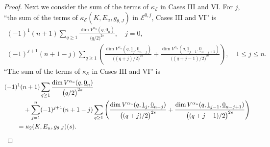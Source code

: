 \documentclass[10pt,a4paper]{amsart}
\numberwithin{equation}{section}
\newcommand{\cE}{\mathcal{E}}
\begin{document}
\begin{proof}
 Next we consider the sum of the terms of $\kappa_{\cE}$ in Cases III and VI.
 For $j$,
 ``the sum of the terms of $\kappa_{\cE} (K, E_{u} , g_{\theta , J} ) $ in $\cE^{0,j}$, Cases III and VI'' is
 \begin{gather*}
 (-1 )^{1} (n+1)
 \sum_{q \geq 1 }
 \frac{
 \dim V^{\alpha_u} ( q ,\underline{0}_{n} )
 }{
 \bigl( q/2 \bigr)^{2s}
 }
 ,
\quad
 j = 0,
 \\
 (-1 )^{j+1} (n+1-j)
 \sum_{q \geq 1 }
 \left(
 \frac{
 \dim V^{\alpha_u} ( q, \underline{1}_{j} ,\underline{0}_{n-j} )
 }{
 \bigl( ( q+j)/2 \bigr)^{2s}
 }
 +
 \frac{
 \dim V^{\alpha_u} ( q, \underline{1}_{j-1} ,\underline{0}_{n-j+1} )
 }{
 \bigl( (q+j-1)/2 \bigr)^{2s}
 }
 \right)
 ,\quad
 1 \leq j \leq n.
 \end{gather*}
 ``The sum of the terms of $\kappa_{\cE}$ in Cases III and VI'' is
 \begin{align}
 &
 (-1 )^{1} (n+1)
 \sum_{q \geq 1 }
 \frac{
 \dim V^{\alpha_u} ( q, \underline{0}_{n} )
 }{
 \bigl( q /2 \bigr)^{2s}
 }
 \notag
 \\
 & \qquad\quad{}+
 \sum_{j=1}^{n}
 (-1 )^{j+1} (n+1-j)
 \sum_{q \geq 1 }
 \left(
 \frac{
 \dim V^{\alpha_u} ( q, \underline{1}_{j} ,\underline{0}_{n-j} )
 }{
 \bigl( ( q+j)/2 \bigr)^{2s}
 }
 +
 \frac{
 \dim V^{\alpha_u} ( q, \underline{1}_{j-1} ,\underline{0}_{n-j+1} )
 }{
 \bigl( (q+j-1)/2 \bigr)^{2s}
 }
 \right)
 \notag
 \\
 &\qquad{}= \kappa_{2} (K, E_{u} , g_{\theta , J} ) (s) .
 \label{eq:kappa2_formula-01}
 \end{align}


\end{proof}
\end{document}
